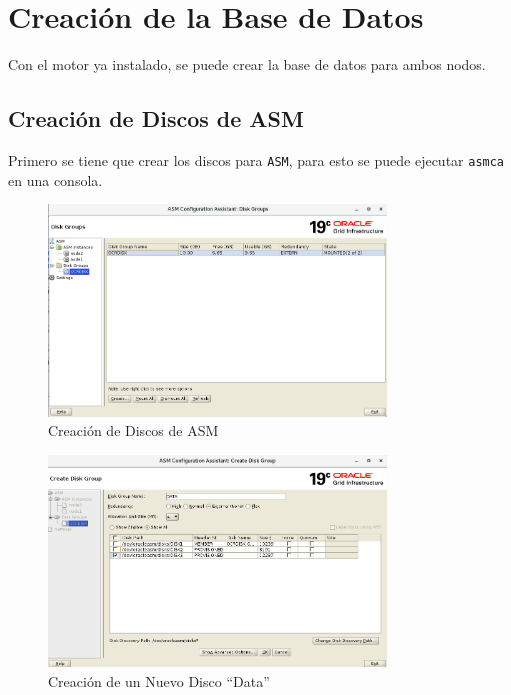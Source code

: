 \documentclass{article}
\begin{document}
\section{Creación de la Base de Datos}

Con el motor ya instalado, se puede crear la base de datos para ambos nodos.

\subsection{Creación de Discos de ASM}

Primero se tiene que crear los discos para \texttt{ASM}, para esto se puede ejecutar \texttt{asmca} en una consola.


\begin{figure}[H]
		\begin{center}
			\includegraphics[width=0.80\textwidth]{db_creation_1_asm_disk_creation_1_menu.png}
		\end{center}
		\caption{Creación de Discos de ASM}
\end{figure}


\begin{figure}[H]
		\begin{center}
			\includegraphics[width=0.80\textwidth]{db_creation_1_asm_disk_creation_2_data.png}
		\end{center}
		\caption{Creación de un Nuevo Disco ``Data''}
\end{figure}
\end{document}
